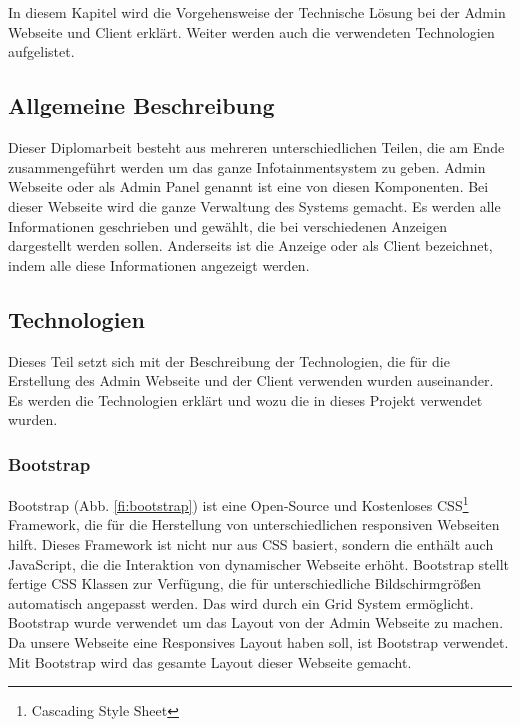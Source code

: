 \chapter{\docname}
\label{\docname}
In diesem Kapitel wird die Vorgehensweise der Technische L\"{o}sung bei der Admin Webseite und Client erkl\"{a}rt. Weiter werden auch die verwendeten Technologien aufgelistet. 

\section{Allgemeine Beschreibung}

Dieser Diplomarbeit besteht aus mehreren unterschiedlichen Teilen, die am Ende zusammengef\"{u}hrt werden um das ganze Infotainmentsystem zu geben. Admin Webseite oder als Admin Panel genannt ist eine von diesen Komponenten. Bei dieser Webseite wird die ganze Verwaltung des Systems gemacht. Es werden alle Informationen geschrieben und gew\"{a}hlt, die bei verschiedenen Anzeigen dargestellt werden sollen. Anderseits ist die Anzeige oder als Client bezeichnet, indem alle diese Informationen angezeigt werden. 


\section{Technologien}

Dieses Teil setzt sich mit der Beschreibung der Technologien, die f\"{u}r die Erstellung des Admin Webseite und der Client verwenden wurden auseinander. Es werden die Technologien erkl\"{a}rt und wozu die in dieses Projekt verwendet wurden.



\subsection{Bootstrap}
Bootstrap (Abb. \ref{fi:bootstrap}) ist eine Open-Source und Kostenloses CSS\footnote{Cascading Style Sheet} Framework, die f\"{u}r die Herstellung von unterschiedlichen responsiven Webseiten hilft. Dieses Framework ist nicht nur aus CSS basiert, sondern die enth\"{a}lt auch JavaScript, die die Interaktion von dynamischer Webseite erh\"{o}ht. Bootstrap stellt fertige CSS Klassen zur Verf\"{u}gung, die f\"{u}r unterschiedliche Bildschirmgr\"{o}\ss{}en automatisch angepasst werden. Das wird durch ein Grid System erm\"{o}glicht. Bootstrap wurde verwendet um das Layout von der Admin Webseite zu machen. Da unsere Webseite eine Responsives Layout haben soll, ist Bootstrap verwendet. Mit Bootstrap wird das gesamte Layout dieser Webseite gemacht.


